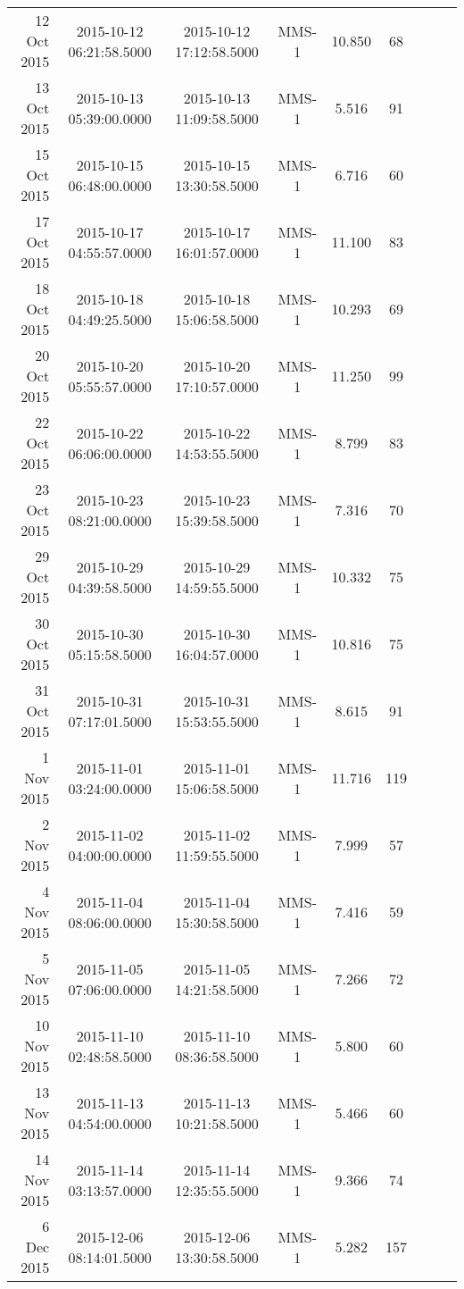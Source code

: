 \begin{longtable}{r|cccccccc}
12 Oct 2015    &  2015-10-12 06:21:58.5000 &  2015-10-12 17:12:58.5000 &  MMS-1 &   10.850 &     68 \\
13 Oct 2015    &  2015-10-13 05:39:00.0000 &  2015-10-13 11:09:58.5000 &  MMS-1 &    5.516 &     91 \\
15 Oct 2015    &  2015-10-15 06:48:00.0000 &  2015-10-15 13:30:58.5000 &  MMS-1 &    6.716 &     60 \\
17 Oct 2015    &  2015-10-17 04:55:57.0000 &  2015-10-17 16:01:57.0000 &  MMS-1 &   11.100 &     83 \\
18 Oct 2015    &  2015-10-18 04:49:25.5000 &  2015-10-18 15:06:58.5000 &  MMS-1 &   10.293 &     69 \\
20 Oct 2015    &  2015-10-20 05:55:57.0000 &  2015-10-20 17:10:57.0000 &  MMS-1 &   11.250 &     99 \\
22 Oct 2015    &  2015-10-22 06:06:00.0000 &  2015-10-22 14:53:55.5000 &  MMS-1 &    8.799 &     83 \\
23 Oct 2015    &  2015-10-23 08:21:00.0000 &  2015-10-23 15:39:58.5000 &  MMS-1 &    7.316 &     70 \\
29 Oct 2015    &  2015-10-29 04:39:58.5000 &  2015-10-29 14:59:55.5000 &  MMS-1 &   10.332 &     75 \\
30 Oct 2015    &  2015-10-30 05:15:58.5000 &  2015-10-30 16:04:57.0000 &  MMS-1 &   10.816 &     75 \\
31 Oct 2015    &  2015-10-31 07:17:01.5000 &  2015-10-31 15:53:55.5000 &  MMS-1 &    8.615 &     91 \\
1 Nov 2015     &  2015-11-01 03:24:00.0000 &  2015-11-01 15:06:58.5000 &  MMS-1 &   11.716 &    119 \\
2 Nov 2015     &  2015-11-02 04:00:00.0000 &  2015-11-02 11:59:55.5000 &  MMS-1 &    7.999 &     57 \\
4 Nov 2015     &  2015-11-04 08:06:00.0000 &  2015-11-04 15:30:58.5000 &  MMS-1 &    7.416 &     59 \\
5 Nov 2015     &  2015-11-05 07:06:00.0000 &  2015-11-05 14:21:58.5000 &  MMS-1 &    7.266 &     72 \\
10 Nov 2015    &  2015-11-10 02:48:58.5000 &  2015-11-10 08:36:58.5000 &  MMS-1 &    5.800 &     60 \\
13 Nov 2015    &  2015-11-13 04:54:00.0000 &  2015-11-13 10:21:58.5000 &  MMS-1 &    5.466 &     60 \\
14 Nov 2015    &  2015-11-14 03:13:57.0000 &  2015-11-14 12:35:55.5000 &  MMS-1 &    9.366 &     74 \\
6 Dec 2015     &  2015-12-06 08:14:01.5000 &  2015-12-06 13:30:58.5000 &  MMS-1 &    5.282 &    157 \\

\end{longtable}
